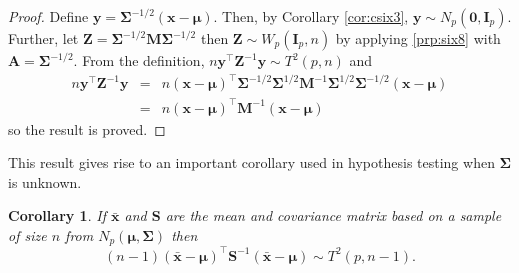 \documentclass[]{book}
\newtheorem{corollary}{Corollary}[chapter]
\theoremstyle{definition}
\theoremstyle{definition}
\theoremstyle{definition}
\theoremstyle{remark}
\begin{document}
\begin{proof}
{}Define \(\mathbf y= \boldsymbol{\Sigma}^{-1/2}(\mathbf x-{\boldsymbol{\mu}})\). Then, by Corollary \ref{cor:csix3}, \(\mathbf y\sim N_p(\boldsymbol 0,\mathbf I_p)\). Further, let \(\mathbf Z= \boldsymbol{\Sigma}^{-1/2} \mathbf M\boldsymbol{\Sigma}^{-1/2}\) then \(\mathbf Z\sim W_p(\mathbf I_p,n)\) by applying \ref{prp:six8} with \(\mathbf A= \boldsymbol{\Sigma}^{-1/2}\). From the definition, \(n \mathbf y^\top \mathbf Z^{-1} \mathbf y\sim T^2(p,n)\) and
\begin{eqnarray*}
n \mathbf y^\top \mathbf Z^{-1} \mathbf y&=& n (\mathbf x-{\boldsymbol{\mu}})^\top \boldsymbol{\Sigma}^{-1/2} \boldsymbol{\Sigma}^{1/2} \mathbf M^{-1} \boldsymbol{\Sigma}^{1/2} \boldsymbol{\Sigma}^{-1/2} (\mathbf x-{\boldsymbol{\mu}}) \\
&=& n(\mathbf x-{\boldsymbol{\mu}})^\top \mathbf M^{-1}(\mathbf x-{\boldsymbol{\mu}})
\end{eqnarray*}
so the result is proved.
\end{proof}

This result gives rise to an important corollary used in hypothesis testing when \(\boldsymbol{\Sigma}\) is unknown.

\begin{corollary}
\protect\hypertarget{cor:csix5}{}{\label{cor:csix5} }If \(\bar{\mathbf x}\) and \(\mathbf S\) are the mean and covariance matrix based on a sample of size \(n\) from \(N_p({\boldsymbol{\mu}},\boldsymbol{\Sigma})\) then
\[ (n-1)(\bar{\mathbf x}-{\boldsymbol{\mu}})^\top \mathbf S^{-1} (\bar{\mathbf x}-{\boldsymbol{\mu}}) \sim T^2(p,n-1).\]
\end{corollary}
\end{document}
